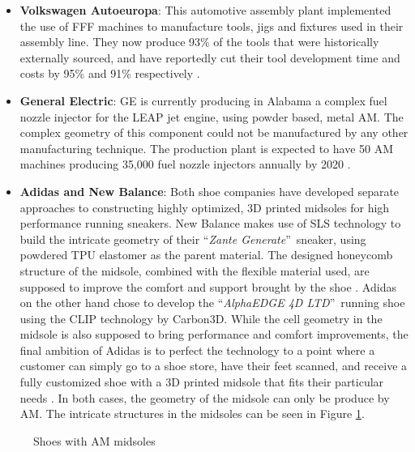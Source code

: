 \documentclass[main.tex]{subfiles}
\begin{document}
\begin{itemize}
	\item \textbf{Volkswagen Autoeuropa}: This automotive assembly plant implemented the use of FFF machines to manufacture tools, jigs and fixtures used in their assembly line. They now produce 93\% of the tools that were historically externally sourced, and have reportedly cut their tool development time and costs by 95\% and 91\% respectively \cite{deVries2017}.
	\item \textbf{General Electric}: GE is currently producing in Alabama a complex fuel nozzle injector for the LEAP jet engine, using powder based, metal AM. The complex geometry of this component could not be manufactured by any other manufacturing technique. The production plant is expected to have 50 AM machines producing 35,000 fuel nozzle injectors annually by 2020 \cite{GEAdditive2016}. 
	\item \textbf{Adidas and New Balance}: Both shoe companies have developed separate approaches to constructing highly optimized, 3D printed midsoles for high performance running sneakers. New Balance makes use of SLS technology to build the intricate geometry of their \textquotedblleft \emph{Zante Generate}\textquotedblright~sneaker, using powdered TPU elastomer as the parent material. The designed honeycomb structure of the midsole, combined with the flexible material used, are supposed to improve the comfort and support brought by the shoe \cite{NewBalance2016}. Adidas on the other hand chose to develop the \textquotedblleft \emph{AlphaEDGE 4D LTD}\textquotedblright~running shoe using the CLIP technology by Carbon3D. While the cell geometry in  the midsole is also supposed to bring performance and comfort improvements, the final ambition of Adidas is to perfect the technology to a point where a customer can simply go to a shoe store, have their feet scanned, and receive a fully customized shoe with a 3D printed midsole that fits their particular needs \cite{Matisons2015,Saunders2018}. In both cases, the geometry of the midsole can only be produce by AM. The intricate structures in the midsoles can be seen in Figure \ref{fig:AMshoes}.
		
\end{itemize}
\begin{figure}[h]
	\center
	\hfill
	\caption{Shoes with AM midsoles}
	\label{fig:AMshoes}
\end{figure}
\end{document}
